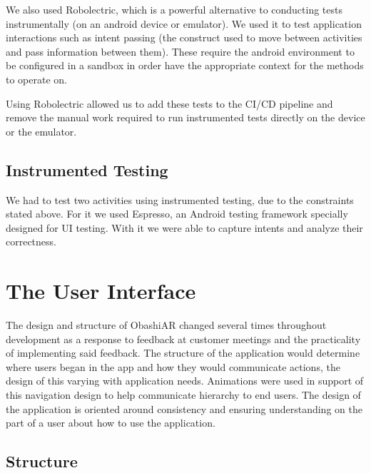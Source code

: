 \documentclass{l3proj}
\begin{document}
We also used Robolectric, which is a powerful alternative to conducting tests instrumentally (on 
an android device or emulator)\cite{Roboelectric}. We used it to test application interactions
such as intent passing (the construct used to move between activities and pass 
information between them). These require the android environment to be configured in
a sandbox in order have the appropriate context for the methods to operate on.

Using Robolectric allowed us to add these tests to the CI/CD pipeline and remove
the manual work required to run instrumented tests directly on the device or the
emulator.

\subsection{Instrumented Testing}

We had to test two activities using instrumented testing, due to the constraints
stated above. For it we used Espresso, an Android testing framework specially 
designed for UI testing. With it we were able to capture intents and analyze their
correctness\cite{Espresso}.


\section{The User Interface}

The design and structure of ObashiAR changed several times throughout development as a response to feedback at customer meetings and the practicality of implementing said feedback. The structure of the application would determine where users began in the app and how they would communicate actions, the design of this varying with application needs. Animations were used in support of this navigation design to help communicate hierarchy to end users. The design of the application is oriented around consistency and ensuring understanding on the part of a user about how to use the application. 

\subsection{Structure}
\end{document}
